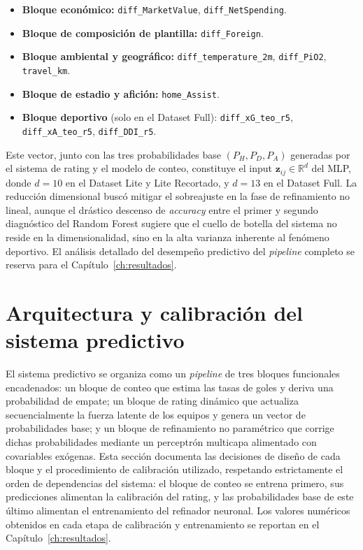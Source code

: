\begin{itemize}
	\item \textbf{Bloque econ\'omico:} \texttt{diff\_MarketValue}, \texttt{diff\_NetSpending}.
	\item \textbf{Bloque de composici\'on de plantilla:} \texttt{diff\_Foreign}.
	\item \textbf{Bloque ambiental y geogr\'afico:} \texttt{diff\_temperature\_2m}, \texttt{diff\_PiO2}, \texttt{travel\_km}.
	\item \textbf{Bloque de estadio y afici\'on:} \texttt{home\_Assist}.
	\item \textbf{Bloque deportivo} (solo en el Dataset Full): \texttt{diff\_xG\_teo\_r5}, \texttt{diff\_xA\_teo\_r5}, \texttt{diff\_DDI\_r5}.
\end{itemize}

Este vector, junto con las tres probabilidades base $(P_H, P_D, P_A)$ generadas por el sistema de rating y el modelo de conteo, constituye el input $\mathbf{z}_{ij} \in \mathbb{R}^{d}$ del MLP, donde $d=10$ en el Dataset Lite y Lite Recortado, y $d=13$ en el Dataset Full. La reducci\'on dimensional busc\'o mitigar el sobreajuste en la fase de refinamiento no lineal, aunque el dr\'astico descenso de \emph{accuracy} entre el primer y segundo diagn\'ostico del Random Forest sugiere que el cuello de botella del sistema no reside en la dimensionalidad, sino en la alta varianza inherente al fen\'omeno deportivo. El an\'alisis detallado del desempe\~no predictivo del \textit{pipeline} completo se reserva para el Cap\'itulo~\ref{ch:resultados}.


\section{Arquitectura y calibraci\'on del sistema predictivo}
\label{sec:arquitectura}

El sistema predictivo se organiza como un \textit{pipeline} de tres bloques funcionales encadenados: un bloque de conteo que estima las tasas de goles y deriva una probabilidad de empate; un bloque de rating din\'amico que actualiza secuencialmente la fuerza latente de los equipos y genera un vector de probabilidades base; y un bloque de refinamiento no param\'etrico que corrige dichas probabilidades mediante un perceptr\'on multicapa alimentado con covariables ex\'ogenas. Esta secci\'on documenta las decisiones de dise\~no de cada bloque y el procedimiento de calibraci\'on utilizado, respetando estrictamente el orden de dependencias del sistema: el bloque de conteo se entrena primero, sus predicciones alimentan la calibraci\'on del rating, y las probabilidades base de este \'ultimo alimentan el entrenamiento del refinador neuronal. Los valores num\'ericos obtenidos en cada etapa de calibraci\'on y entrenamiento se reportan en el Cap\'itulo~\ref{ch:resultados}.

